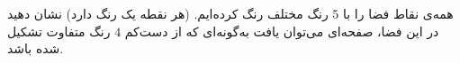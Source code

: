 \EXERCISE
همه‌ی نقاط فضا را با
$5$
رنگ مختلف رنگ کرده‌ایم. (هر نقطه یک رنگ دارد) نشان دهید در این فضا، صفحه‌ای می‌توان یافت به‌گونه‌ای که از دست‌کم
$4$
رنگ متفاوت تشکیل شده باشد.